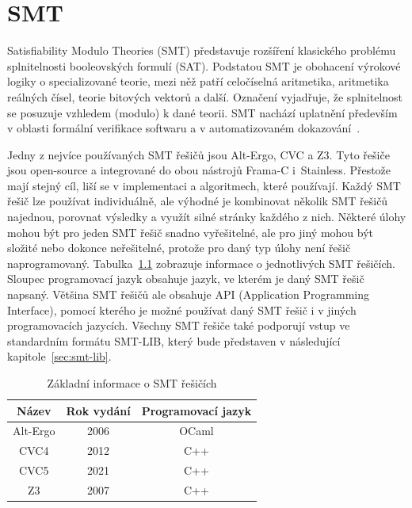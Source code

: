 \chapter{SMT}
\label{ch:smt}

Satisfiability Modulo Theories (SMT) představuje rozšíření klasického problému splnitelnosti booleovských formulí (SAT).
Podstatou SMT je obohacení výrokové logiky o specializované teorie,
mezi něž patří celočíselná aritmetika, aritmetika reálných čísel, teorie bitových vektorů a další.
Označení  vyjadřuje, že splnitelnost se posuzuje vzhledem (modulo) k dané teorii.
SMT nachází uplatnění především v oblasti formální verifikace softwaru a v automatizovaném dokazování~\cite{SMT}.

Jedny z nejvíce používaných SMT řešičů jsou Alt-Ergo, CVC a Z3.
Tyto řešiče jsou open-source a integrované do obou nástrojů Frama\mbox{-}C i~Stainless.
Přestože mají stejný cíl, liší se v implementaci a algoritmech, které používají.
Každý SMT řešič lze používat individuálně,
ale výhodné je kombinovat několik SMT řešičů najednou, porovnat výsledky a využít silné stránky každého z nich.
Některé úlohy mohou být pro jeden SMT řešič snadno vyřešitelné,
ale pro jiný mohou být složité nebo dokonce neřešitelné,
protože pro daný typ úlohy není řešič naprogramovaný.
Tabulka~\ref{tab:smt-resice} zobrazuje informace o jednotlivých SMT řešičích.
Sloupec programovací jazyk obsahuje jazyk, ve kterém je daný SMT řešič napsaný.
Většina SMT řešičů ale obsahuje API (Application Programming Interface),
pomocí kterého je možné používat daný SMT řešič i v jiných programovacích jazycích.
Všechny SMT řešiče také podporují vstup ve standardním formátu SMT-LIB,
který bude představen v následující kapitole~\ref{sec:smt-lib}.

\begin{table}[H]
    \centering
    \begin{tabular}{|c|c|c|}
        \hline
        \textbf{Název} & \textbf{Rok vydání}  & \textbf{Programovací jazyk} \\
        \hline
        Alt-Ergo       & 2006                 & OCaml                       \\
        CVC4           & 2012                 & C++                         \\
        CVC5           & 2021                 & C++                         \\
        Z3             & 2007                 & C++                         \\
        \hline
    \end{tabular}
    \caption{Základní informace o SMT řešičích}
    \label{tab:smt-resice}
\end{table}


